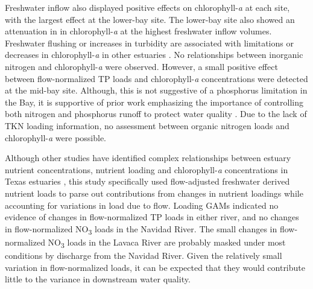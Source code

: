 \documentclass[fleqn,10pt,lineno]{wlpeerj} %
\begin{document}
Freshwater inflow also displayed positive effects on
chlorophyll-\emph{a} at each site, with the largest effect at the
lower-bay site. The lower-bay site also showed an attenuation in in
chlorophyll-\emph{a} at the highest freshwater inflow volumes.
Freshwater flushing or increases in turbidity are associated with
limitations or decreases in chlorophyll-\emph{a} in other estuaries
\autocite{peierlsNonmonotonicResponsesPhytoplankton2012,cloernPhytoplanktonPrimaryProduction2014}.
No relationships between inorganic nitrogen and chlorophyll-\emph{a}
were observed. However, a small positive effect between flow-normalized
TP loads and chlorophyll-\emph{a} concentrations were detected at the
mid-bay site. Although, this is not suggestive of a phosphorus
limitation in the Bay, it is supportive of prior work emphasizing the
importance of controlling both nitrogen and phosphorus runoff to protect
water quality \autocite{conleyControllingEutrophicationNitrogen2009}.
Due to the lack of TKN loading information, no assessment between
organic nitrogen loads and chlorophyll-\emph{a} were possible.

Although other studies have identified complex relationships between
estuary nutrient concentrations, nutrient loading and
chlorophyll-\emph{a} concentrations in Texas estuaries
\autocite{ornolfsdottirNutrientPulsingRegulator2004,doradoUnderstandingInteractionsFreshwater2015,ciraPhytoplanktonDynamicsLowinflow2021,tominackVariabilityPhytoplanktonBiomass2022},
this study specifically used flow-adjusted freshwater derived nutrient
loads to parse out contributions from changes in nutrient loadings while
accounting for variations in load due to flow. Loading GAMs indicated no
evidence of changes in flow-normalized TP loads in either river, and no
changes in flow-normalized NO\textsubscript{3} loads in the Navidad
River. The small changes in flow-normalized NO\textsubscript{3} loads in
the Lavaca River are probably masked under most conditions by discharge
from the Navidad River. Given the relatively small variation in
flow-normalized loads, it can be expected that they would contribute
little to the variance in downstream water quality.
\end{document}

